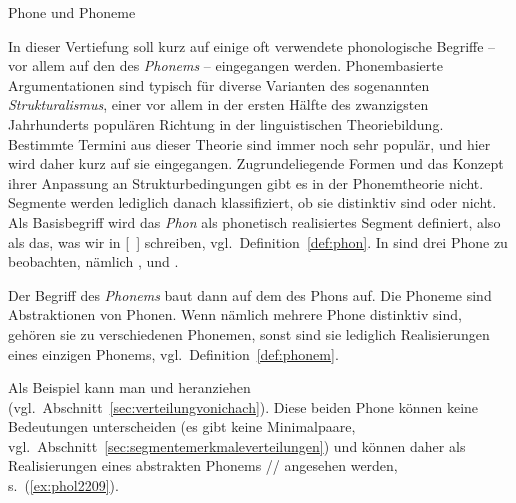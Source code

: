 \begin{Vertiefung}{Phone und Phoneme}

\label{vert:phonephoneme}

\noindent In dieser Vertiefung soll kurz auf einige oft verwendete phonologische Begriffe -- vor allem auf den des \textit{Phonems} -- eingegangen werden.
Phonembasierte Argumentationen sind typisch für diverse Varianten des sogenannten \textit{Strukturalismus}, einer vor allem in der ersten Hälfte des zwanzigsten Jahrhunderts populären Richtung in der linguistischen Theoriebildung.
Bestimmte Termini aus dieser Theorie sind immer noch sehr populär, und hier wird daher kurz auf sie eingegangen.
Zugrundeliegende Formen und das Konzept ihrer Anpassung an Strukturbedingungen gibt es in der Phonemtheorie nicht.
Segmente werden lediglich danach klassifiziert, ob sie distinktiv sind oder nicht.
Als Basisbegriff wird das \textit{Phon} als phonetisch realisiertes Segment definiert, also als das, was wir in [~] schreiben, vgl.\ Definition~\ref{def:phon}.
In \textipa{[ta:k]} sind drei Phone zu beobachten, nämlich \textipa{[t]}, \textipa{[a:]} und \textipa{[k]}.


Der Begriff des \textit{Phonems} baut dann auf dem des Phons auf.
Die Phoneme sind Abstraktionen von Phonen.
Wenn nämlich mehrere Phone distinktiv sind, gehören sie zu verschiedenen Phonemen, sonst sind sie lediglich Realisierungen eines einzigen Phonems, vgl.\ Definition~\ref{def:phonem}.



Als Beispiel kann man \textipa{[\c{c}]} und \textipa{[X]} heranziehen (vgl.\ Abschnitt~\ref{sec:verteilungvonichach}).
Diese beiden Phone können keine Bedeutungen unterscheiden (es gibt keine Minimalpaare, vgl.\ Abschnitt~\ref{sec:segmentemerkmaleverteilungen}) und können daher als Realisierungen eines abstrakten Phonems // angesehen werden, s.\ (\ref{ex:phol2209}).

\begin{exe}
  \ex\label{ex:phol2209}
  \begin{xlist}
  \end{xlist}
\end{exe}


\end{Vertiefung}
